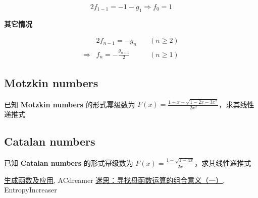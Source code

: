 \documentclass[UTF8]{article}
\begin{document}
$$
2f_{1-1}=-1-g_1 \Rightarrow f_0=1
$$

\textbf{其它情况}

$$
\begin{aligned}
&2f_{n-1}=-g_n \quad &(n \ge 2) \\
\Rightarrow &f_{n}=-\frac{g_{n+1}}{2} \quad & (n \ge 1)
\end{aligned}
$$

\subsection{Motzkin numbers}

已知 \textbf{Motzkin numbers} 的形式幂级数为 $F(x)=\frac{1-x-\sqrt{1-2x-3x^2}}{2x^2}$，求其线性递推式

\subsection{Catalan numbers}

已知 \textbf{Catalan numbers} 的形式幂级数为 $F(x)=\frac{1-\sqrt{1-4x}}{2x}$，求其线性递推式

\begin{thebibliography}{}
    \href{https://zhuanlan.zhihu.com/p/31457805}{生成函数及应用}, ACdreamer
    \href{https://zhuanlan.zhihu.com/p/54318231}{迷思：寻找母函数运算的组合意义（一）}, EntropyIncreaser
\end{thebibliography}
\end{document}
